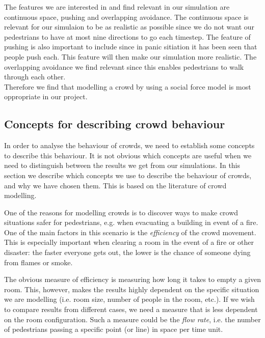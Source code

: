 The features we are interested in and find relevant in our simulation are continuous space, pushing and overlapping avoidance. The continuous space is
relevant for our simulaion to be as realistic as possible since we do not want our pedestrians to have at most nine directions to go each timestep.
The feature of pushing is also important to include since in panic sitiation it has been seen that people push each. This feature will then make our
simulation more realistic.
The overlapping avoidance we find relevant since this enables pedestrians to walk through each other.
\\
Therefore we find that modelling a crowd by using a social force model is most oppropriate in our project. 


\subsection{Concepts for describing crowd behaviour}
In order to analyse the behaviour of crowds, we need to establish some 
concepts to describe this behaviour. It is not obvious which concepts  are 
useful when we need to distinguish between the results we get from our 
simulations. In this section we describe which concepts we use to describe the 
behaviour of crowds, and why we have chosen them. This is based on the 
literature of crowd modelling.

One of the reasons for modelling crowds is to discover ways to make crowd 
situations safer for pedestrians, e.g. when evacuating a building in event of 
a fire. One of the main factors in this scenario is the \emph{efficiency} of 
the crowd movement. This is especially important when clearing a room in the 
event of a fire or other disaster: the faster everyone gets out, the lower is 
the chance of someone dying from flames or smoke.

The obvious measure of efficiency is measuring how long it takes to empty a 
given room. This, however, makes the results highly dependent on the specific 
situation we are modelling (i.e. room size, number of people in the room, 
etc.). If we wish to compare results from different cases, we need a measure 
that is less dependent on the room configuration. Such a measure could be the 
\emph{flow rate}, i.e. the number of pedestrians passing a specific point (or 
line) in space per time unit.


